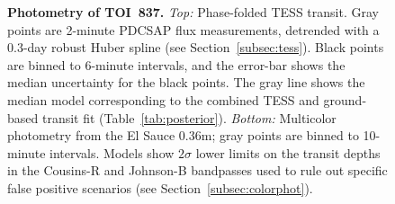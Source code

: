 \documentclass[12pt,twocolumn,tighten]{aastex63}
\newcommand{\tn}{TOI~837} %
\begin{document}
\begin{figure}[!t]
	\begin{center}
		\leavevmode
		
		\vspace{-0.6cm}
	\end{center}
	\vspace{-0.7cm}
  \caption{
    {\bf Photometry of \tn.} {\it Top:}
    Phase-folded TESS transit. Gray points are 2-minute PDCSAP flux
    measurements, detrended with a 0.3-day robust Huber spline (see
    Section~\ref{subsec:tess}).  Black points are binned to 6-minute
    intervals, and the error-bar shows the median uncertainty for the
    black points.  The gray line shows the median model corresponding
    to the combined TESS and ground-based transit fit
    (Table~\ref{tab:posterior}).  {\it Bottom:} Multicolor photometry from the El Sauce
    0.36m; gray points are binned to 10-minute intervals.  Models show
    $2\sigma$ lower limits on the transit depths in the Cousins-R and
    Johnson-B bandpasses used to rule out specific false positive
    scenarios (see Section~\ref{subsec:colorphot}).
    \label{fig:jointphot}
	}
\end{figure}
\end{document}
